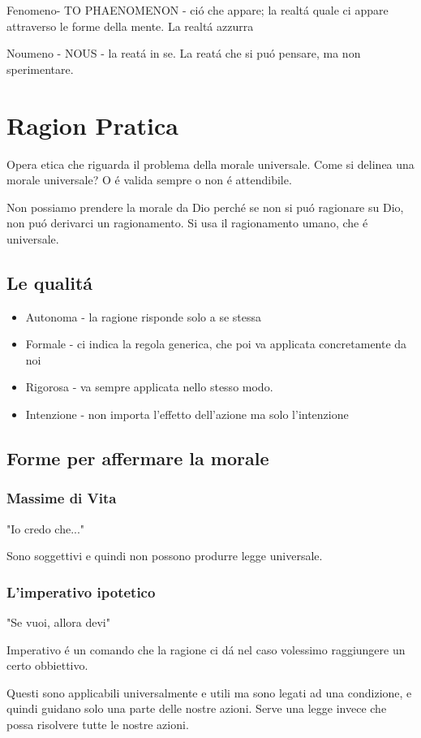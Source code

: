 \documentclass{article}
\begin{document}
Fenomeno- TO PHAENOMENON - ció che appare; la realtá quale ci appare attraverso le forme della mente. La realtá azzurra

Noumeno - NOUS - la reatá in se. La reatá che si puó pensare, ma non sperimentare.

\section{Ragion Pratica}
Opera etica che riguarda il problema della morale universale. Come si delinea una morale universale? O é valida sempre o non é attendibile.

Non possiamo prendere la morale da Dio perché se non si puó ragionare su Dio, non puó derivarci un ragionamento. Si usa il ragionamento umano, che é universale.

\subsection{Le qualitá}
\begin{itemize}
\item Autonoma - la ragione risponde solo a se stessa
\item Formale - ci indica la regola generica, che poi va applicata concretamente da noi
\item Rigorosa - va sempre applicata nello stesso modo.
\item Intenzione - non importa l'effetto dell'azione ma solo l'intenzione
\end{itemize}
\subsection{Forme per affermare la morale}
\subsubsection{Massime di Vita}
"Io credo che..."

Sono soggettivi e quindi non possono produrre legge universale.
\subsubsection{L'imperativo ipotetico}
"Se vuoi, allora devi"

Imperativo é un comando che la ragione ci dá nel caso volessimo raggiungere un certo obbiettivo.

Questi sono applicabili universalmente e utili ma sono legati ad una condizione, e quindi guidano solo una parte delle nostre azioni. Serve una legge invece che possa risolvere tutte le nostre azioni.
\end{document}
